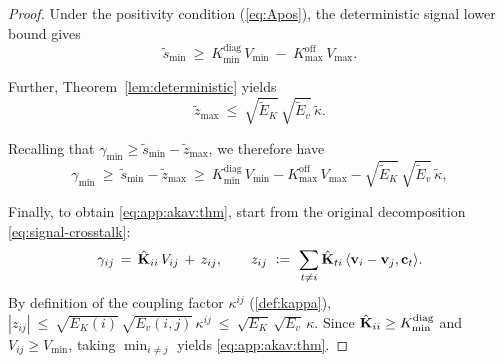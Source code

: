 \begin{proof}
Under the positivity condition (\eqref{eq:Apos}), the deterministic signal lower bound gives
\[
\widetilde{s}_{\min}\ \ge\ K_{\min}^{\mathrm{diag}}\,V_{\min}\ -\ K_{\max}^{\mathrm{off}}\,V_{\max}.
\]

Further, Theorem~\ref{lem:deterministic} yields
\[
\widetilde{z}_{\max}\ \le\ \sqrt{\widetilde{E}_K}\,\sqrt{\widetilde{E}_v}\,\widetilde{\kappa}.
\]

Recalling that \(\gamma_{\min}\ge \widetilde{s}_{\min}-\widetilde{z}_{\max}\), we therefore have
\[
\gamma_{\min}
\ \ge\ \widetilde{s}_{\min}-\widetilde{z}_{\max}
\ \ge\ K_{\min}^{\mathrm{diag}}\,V_{\min}
-
K_{\max}^{\mathrm{off}}\,V_{\max}
-
\sqrt{\widetilde{E}_K}\,\sqrt{\widetilde{E}_v}\,\widetilde{\kappa},
\]


Finally, to obtain \eqref{eq:app:akav:thm}, start from the original decomposition \eqref{eq:signal-crosstalk}:
\[
\gamma_{ij} \,=\, \hat{\mathbf{K}}_{ii}\,V_{ij} \,+\, z_{ij},
\qquad
z_{ij}\ \vcentcolon=\ \sum_{t\neq i}\hat{\mathbf{K}}_{ti}\,\langle {{\mathbf{v}}_{i}-{\mathbf{v}}_j}, {{\mathbf{c}}_t} \rangle.
\]
By definition of the coupling factor $\kappa^{ij}$ (\cref{def:kappa}),
\(
|z_{ij}|\ \le\ \sqrt{E_{K}(i)}\,\sqrt{E_{v}(i,j)}\,\kappa^{ij}
\ \le\ \sqrt{E_K}\,\sqrt{E_v}\,\kappa.
\)
Since $\hat{\mathbf{K}}_{ii}\ge K_{\min}^{\mathrm{diag}}$ and $V_{ij}\ge V_{\min}$, taking $\min_{i\neq j}$ yields \eqref{eq:app:akav:thm}.

\end{proof}

